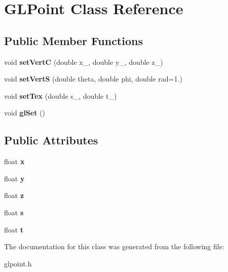 \hypertarget{classGLPoint}{
\section{GLPoint Class Reference}
\label{classGLPoint}
}
\subsection*{Public Member Functions}
\begin{DoxyCompactItemize}
\item 
\hypertarget{classGLPoint_a37358342fe3186b1be42c6d4905f8abe}{
void {\bfseries setVertC} (double x\_\-, double y\_\-, double z\_\-)}
\label{classGLPoint_a37358342fe3186b1be42c6d4905f8abe}

\item 
\hypertarget{classGLPoint_ab5dc1a8228dcebf52f842be32dcb4bdf}{
void {\bfseries setVertS} (double theta, double phi, double rad=1.)}
\label{classGLPoint_ab5dc1a8228dcebf52f842be32dcb4bdf}

\item 
\hypertarget{classGLPoint_a23c643c81163bdc738249de6ad037e67}{
void {\bfseries setTex} (double s\_\-, double t\_\-)}
\label{classGLPoint_a23c643c81163bdc738249de6ad037e67}

\item 
\hypertarget{classGLPoint_ae79dcec4e2ad77a9cfce8f5810ae6b8a}{
void {\bfseries glSet} ()}
\label{classGLPoint_ae79dcec4e2ad77a9cfce8f5810ae6b8a}

\end{DoxyCompactItemize}
\subsection*{Public Attributes}
\begin{DoxyCompactItemize}
\item 
\hypertarget{classGLPoint_a99285fe9e7213350dce11b3b7e0282a3}{
float {\bfseries x}}
\label{classGLPoint_a99285fe9e7213350dce11b3b7e0282a3}

\item 
\hypertarget{classGLPoint_a02ace0e911b63a56be4c38bbd53bc54f}{
float {\bfseries y}}
\label{classGLPoint_a02ace0e911b63a56be4c38bbd53bc54f}

\item 
\hypertarget{classGLPoint_af908897d454290a995a50047bfa9adf3}{
float {\bfseries z}}
\label{classGLPoint_af908897d454290a995a50047bfa9adf3}

\item 
\hypertarget{classGLPoint_add99283cfcd025749a9b903caa5d6676}{
float {\bfseries s}}
\label{classGLPoint_add99283cfcd025749a9b903caa5d6676}

\item 
\hypertarget{classGLPoint_a5775e6a1e57e4c318f6fed35f136f11e}{
float {\bfseries t}}
\label{classGLPoint_a5775e6a1e57e4c318f6fed35f136f11e}

\end{DoxyCompactItemize}


The documentation for this class was generated from the following file:\begin{DoxyCompactItemize}
\item 
glpoint.h\end{DoxyCompactItemize}
